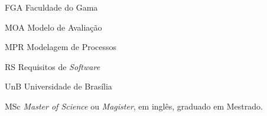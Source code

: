\begin{siglas}
	\item[FGA] Faculdade do Gama
	\item[MOA] Modelo de Avaliação
	\item[MPR] Modelagem de Processos
	\item[RS] Requisitos de \emph{Software}
	\item[UnB] Universidade de Brasília
	\item[MSc] \emph{Master of Science} ou \emph{Magister}, em inglês, graduado em Mestrado.
\end{siglas}
